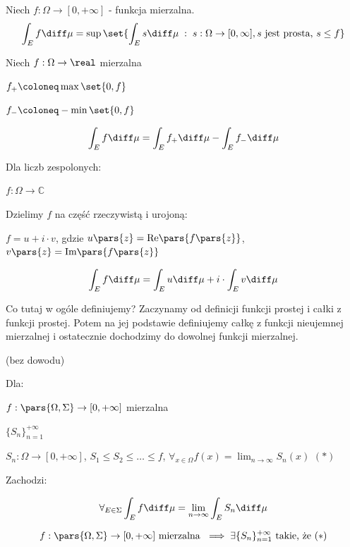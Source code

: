 \begin{definition}
	Niech \( f: \Omega\to [0, +\infty] \) - funkcja mierzalna.
	\[
		\int_E f \diff \mu = \sup \set{\int_E s \diff \mu \; : \; s: \Omega\to [0, \infty], s \text{ jest prosta, } s \leq f }
	\]
\end{definition}

\begin{definition}
	Niech  \( f: \Omega\to \real \) mierzalna

	\( f_+ \coloneq \max \set{0, f} \)

	\( f_- \coloneq -\min \set{0, f} \)

	\[
		\int_E f \diff \mu = \int_E f_+ \diff \mu - \int_E f_- \diff \mu
	\]
\end{definition}

\begin{definition}
	Dla liczb zespolonych:

	\( f: \Omega\to \mathbb{C} \)

	Dzielimy \( f \) na część rzeczywistą i urojoną:

	\( f = u + i \cdot v \), gdzie \( u\pars{ z } = \text{Re}\pars{ f\pars{ z } } \), \( v\pars{ z } = \text{Im}\pars{ f\pars{ z } } \)

	\[
		\int_E f \diff \mu = \int_E u \diff \mu + i \cdot \int_E v \diff \mu
	\]
\end{definition}

Co tutaj w ogóle definiujemy? Zaczynamy od definicji funkcji prostej i całki z funkcji prostej. Potem na jej podstawie definiujemy całkę z funkcji nieujemnej mierzalnej i ostatecznie dochodzimy do dowolnej funkcji mierzalnej.

\begin{theorem} (bez dowodu)

	Dla:

	\( f: \pars{ \Omega, \Sigma } \to [0, +\infty] \) mierzalna

	\( \{S_n\}_{n = 1}^{+\infty} \)

	\( S_n : \Omega \to [0, +\infty] \), \( S_1 \leq S_2 \leq \ldots \leq f \), \( \forall_{x \in \Omega} f(x) = \lim_{n \to \infty} S_n(x) \) \hfill \( (*) \)

	Zachodzi:

	\[
		\forall_{E \in \Sigma} \int_E f \diff \mu = \lim_{n \to \infty} \int_E S_n \diff \mu
	\]
\end{theorem}

\begin{theorem}
	\[
		f : \pars{ \Omega, \Sigma } \to [0, +\infty] \text{ mierzalna } \implies \exists \{S_n\}_{n = 1}^{+\infty} \text{ takie, że } (*)
	\]
\end{theorem}

